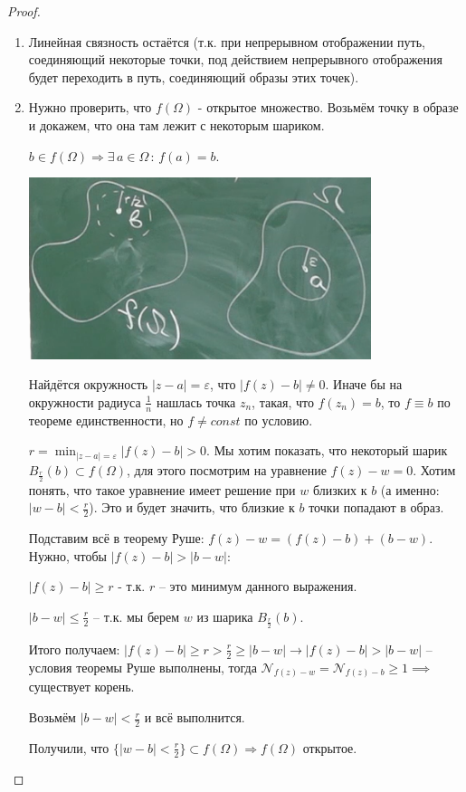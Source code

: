 \begin{proof}
    \begin{enumerate}
        \item {
            Линейная связность остаётся (т.к. при непрерывном отображении путь, соединяющий некоторые точки, под действием непрерывного отображения будет переходить в путь, соединяющий образы этих точек).
        }
        \item {
            Нужно проверить, что $f(\Omega)$ - открытое множество. Возьмём точку
            в образе и докажем, что она там лежит с некоторым шариком.

            $b \in f(\Omega) \Rightarrow \exists \, a \in \Omega \, : \, f(a) = b$.


            \begin{center}
                \includegraphics[width=10cm]{assets/04-functions-of-complex-variables/single-leaf-theorem.png}
            \end{center}

            Найдётся окружность $|z - a| = \varepsilon$, что $|f(z) - b| \neq 0$. Иначе бы на окружности радиуса $\frac{1}{n}$ нашлась точка $z_n$,
            такая, что $f(z_n) = b$, то $f \equiv b$ по теореме единственности, но $f \neq const$ по условию.

            $r = \min_{|z - a| = \varepsilon} |f(z) - b| > 0$. Мы хотим показать, что некоторый шарик $B_{\frac{r}{2}}(b) \subset f(\Omega)$, для этого посмотрим на уравнение $f(z) - w = 0$. Хотим понять, что такое уравнение
            имеет решение при $w$ близких к $b$ (а именно: $|w - b| < \frac{r}{2}$). Это и будет значить, что близкие к $b$ точки попадают в образ.

            Подставим всё в теорему Руше: $f(z) - w = (f(z) - b) + (b - w)$. Нужно, чтобы $|f(z) - b| > |b - w|$:

            $|f(z) - b| \geq r$ - т.к. $r$ -- это минимум данного выражения.

            $|b - w| \leq \frac{r}{2}$ -- т.к. мы берем $w$ из шарика $B_{\frac{r}{2}}(b)$.

            Итого получаем: $|f(z) - b| \geq r > \frac{r}{2} \geq |b - w| \rightarrow |f(z) - b| > |b-w|$ -- условия теоремы Руше выполнены, тогда $\mathcal{N}_{f(z) - w} = \mathcal{N}_{f(z) - b} \geq 1 \implies$ существует корень.

            Возьмём $|b-w| < \frac{r}{2}$ и всё выполнится.

            Получили, что $\{ |w-b| < \frac{r}{2} \} \subset f(\Omega) \Rightarrow f(\Omega)$ открытое.
        }
    \end{enumerate}
\end{proof}

